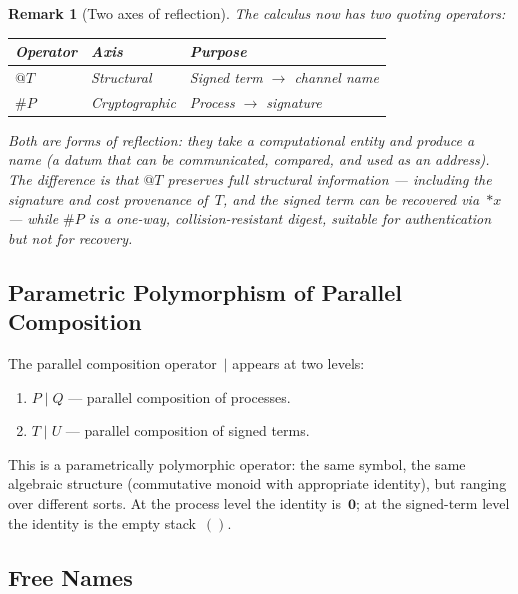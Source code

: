 \documentclass[11pt,a4paper]{article}
\makeatletter
\newtheorem{remark}[theorem]{Remark}
\newcommand{\Par}{\mathbin{|}}
\newcommand{\nil}{\mathbf{0}}
\newcommand{\drop}[1]{{\ast} #1}
\newcommand{\quot}[1]{@#1}
\newcommand{\hashf}{\texttt{\#}}
\makeatother
\begin{document}
\begin{remark}[Two axes of reflection]
  \label{rem:two-axes}
  The calculus now has two quoting operators:
  \begin{center}
    \begin{tabular}{lll}
      \textbf{Operator} & \textbf{Axis} & \textbf{Purpose} \\
      \midrule
      $\quot{T}$ & Structural  & Signed term $\to$ channel name \\
      $\hashf P$ & Cryptographic & Process $\to$ signature \\
    \end{tabular}
  \end{center}
  Both are forms of \emph{reflection}: they take a computational
  entity and produce a \emph{name} (a datum that can be
  communicated, compared, and used as an address).  The
  difference is that $\quot{T}$ preserves full structural
  information --- including the signature and cost provenance
  of~$T$, and the signed term can be recovered
  via~$\drop{x}$ --- while $\hashf P$ is a one-way,
  collision-resistant digest, suitable for authentication but
  not for recovery.
\end{remark}

\subsection{Parametric Polymorphism of Parallel Composition}
\label{sec:par-poly}

The parallel composition operator~$\Par$ appears at two levels:

\begin{enumerate}[nosep]
  \item $P \Par Q$ --- parallel composition of processes.
  \item $T \Par U$ --- parallel composition of signed terms.
\end{enumerate}

\noindent
This is a parametrically polymorphic operator: the same symbol,
the same algebraic structure (commutative monoid with
appropriate identity), but ranging over different sorts.  At the
process level the identity is~$\nil$; at the signed-term level
the identity is the empty stack~$()$.

\subsection{Free Names}
\label{sec:fn}
\end{document}
